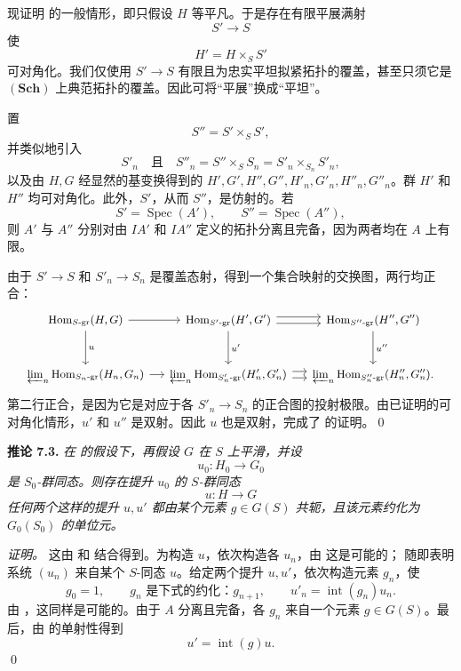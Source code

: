 现证明  的一般情形，即只假设 \(H\) 等平凡。于是存在有限平展满射
\[
  S'\longrightarrow S
\]
使
\[
  H'=H\times_SS'
\]
可对角化。我们仅使用 \(S'\to S\) 有限且为忠实平坦拟紧拓扑的覆盖，甚至只须它是 \((\mathbf{Sch})\) 上典范拓扑的覆盖。因此可将“平展”换成“平坦”。

置
\[
  S''=S'\times_SS',
\]
并类似地引入
\[
  S'_n
  \quad\text{且}\quad
  S''_n
  =S''\times_SS_n
  =S'_n\times_{S_n}S'_n,
\]
以及由 \(H,G\) 经显然的基变换得到的 \(H',G',H'',G'',H'_n,G'_n,H''_n,G''_n\)。群 \(H'\) 和 \(H''\) 均可对角化。此外，\(S'\)，从而 \(S''\)，是仿射的。若
\[
  S'=\operatorname{Spec}(A'),
  \qquad
  S''=\operatorname{Spec}(A''),
\]
则 \(A'\) 与 \(A''\) 分别对由 \(IA'\) 和 \(IA''\) 定义的拓扑分离且完备，因为两者均在 \(A\) 上有限。

由于 \(S'\to S\) 和 \(S'_n\to S_n\) 是覆盖态射，得到一个集合映射的交换图，两行均正合：
\[
\begin{tikzcd}[
  column sep=small,
  row sep=large,
  cells={nodes={font=\small}}
]
  \operatorname{Hom}_{S\text{-}\mathrm{gr}}(H,G)
    \arrow[r]
    \arrow[d,"u"]
  & \operatorname{Hom}_{S'\text{-}\mathrm{gr}}(H',G')
    \arrow[r,shift left=.6ex]
    \arrow[r,shift right=.6ex]
    \arrow[d,"u'"]
  & \operatorname{Hom}_{S''\text{-}\mathrm{gr}}(H'',G'')
    \arrow[d,"u''"]
  \\
  \varprojlim_n
    \operatorname{Hom}_{S_n\text{-}\mathrm{gr}}(H_n,G_n)
    \arrow[r]
  & \varprojlim_n
    \operatorname{Hom}_{S'_n\text{-}\mathrm{gr}}(H'_n,G'_n)
    \arrow[r,shift left=.6ex]
    \arrow[r,shift right=.6ex]
  & \varprojlim_n
    \operatorname{Hom}_{S''_n\text{-}\mathrm{gr}}(H''_n,G''_n).
\end{tikzcd}
\]
第二行正合，是因为它是对应于各 \(S'_n\to S_n\) 的正合图的投射极限。由已证明的可对角化情形，\(u'\) 和 \(u''\) 是双射。因此 \(u\) 也是双射，完成了  的证明。\qed

\medskip
\noindent{}\textbf{推论 7.3.}
\textit{在  的假设下，再假设 \(G\) 在 \(S\) 上平滑，并设
\[
  u_0:H_0\longrightarrow G_0
\]
是 \(S_0\)-群同态。则存在提升 \(u_0\) 的 \(S\)-群同态
\[
  u:H\longrightarrow G
\]
任何两个这样的提升 \(u,u'\) 都由某个元素 \(g\in G(S)\) 共轭，且该元素约化为 \(G_0(S_0)\) 的单位元。}

\emph{证明。}
这由  和  结合得到。为构造 \(u\)，依次构造各 \(u_n\)，由  这是可能的； 随即表明系统 \((u_n)\) 来自某个 \(S\)-同态 \(u\)。给定两个提升 \(u,u'\)，依次构造元素 \(g_n\)，使
\[
  g_0=1,
  \qquad
  g_n\text{ 是下式的约化：}g_{n+1},
  \qquad
  u'_n=\operatorname{int}(g_n)u_n.
\]
由 ，这同样是可能的。由于 \(A\) 分离且完备，各 \(g_n\) 来自一个元素 \(g\in G(S)\)。最后，由  的单射性得到
\[
  u'=\operatorname{int}(g)u.
\]
\qed

